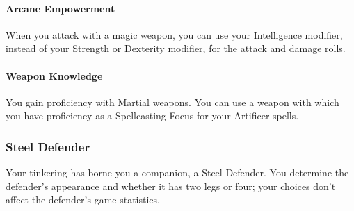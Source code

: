 \documentclass[letterpaper,openany,oneside,twocolumn]{book}
\begin{document}
\paragraph*{Arcane Empowerment} When you attack with a magic weapon, you can use your Intelligence modifier, instead of your Strength or Dexterity modifier, for the attack and damage rolls.
\paragraph*{Weapon Knowledge} You gain proficiency with Martial weapons. You can use a weapon with which you have proficiency as a Spellcasting Focus for your Artificer spells.
\subsubsection*{Steel Defender}
Your tinkering has borne you a companion, a Steel Defender. You determine the defender's appearance and whether it has two legs or four; your choices don't affect the defender's game statistics.
\end{document}
